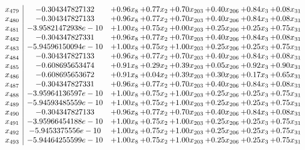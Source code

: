 \documentclass[8pt]{article}
\begin{document}
\[\begin{array}{c| c c@{\hskip 2pt} c@{\hskip 2pt} c@{\hskip 2pt} c@{\hskip 2pt} c@{\hskip 2pt} c@{\hskip 2pt} }
 x_{479}   &  -0.304347827132 & +  0.96 x_{8} & +  0.77 x_{2} & +  0.70 x_{203} & +  0.40 x_{206} & +  0.84 x_{3} & +  0.08 x_{31}\\
 x_{480}   &  -0.304347827133 & +  0.96 x_{8} & +  0.77 x_{2} & +  0.70 x_{203} & +  0.40 x_{206} & +  0.84 x_{3} & +  0.08 x_{31}\\
 x_{481}   &  -3.95821472938e-10 & +  1.00 x_{8} & +  0.75 x_{2} & +  0.00 x_{203} & +  0.25 x_{206} & +  0.25 x_{3} & +  0.75 x_{31}\\
 x_{482}   &  -0.304347827331 & +  0.96 x_{8} & +  0.77 x_{2} & +  0.70 x_{203} & +  0.40 x_{206} & +  0.84 x_{3} & +  0.08 x_{31}\\
 x_{483}   &  -5.94596150094e-10 & +  1.00 x_{8} & +  0.75 x_{2} & +  1.00 x_{203} & +  0.25 x_{206} & +  0.25 x_{3} & +  0.75 x_{31}\\
 x_{484}   &  -0.304347827133 & +  0.96 x_{8} & +  0.77 x_{2} & +  0.70 x_{203} & +  0.40 x_{206} & +  0.84 x_{3} & +  0.08 x_{31}\\
 x_{485}   &  -0.608695653474 & +  0.91 x_{8} & +  0.29 x_{2} & +  0.39 x_{203} & +  0.05 x_{206} & +  0.92 x_{3} & +  0.90 x_{31}\\
 x_{486}   &  -0.608695653672 & +  0.91 x_{8} & +  0.04 x_{2} & +  0.39 x_{203} & +  0.30 x_{206} & +  0.17 x_{3} & +  0.65 x_{31}\\
 x_{487}   &  -0.304347827331 & +  0.96 x_{8} & +  0.77 x_{2} & +  0.70 x_{203} & +  0.40 x_{206} & +  0.84 x_{3} & +  0.08 x_{31}\\
 x_{488}   &  -3.95964136597e-10 & +  1.00 x_{8} & +  0.75 x_{2} & +  1.00 x_{203} & +  0.25 x_{206} & +  0.25 x_{3} & +  0.75 x_{31}\\
 x_{489}   &  -5.94593485559e-10 & +  1.00 x_{8} & +  0.75 x_{2} & +  1.00 x_{203} & +  0.25 x_{206} & +  0.25 x_{3} & +  0.75 x_{31}\\
 x_{490}   &  -0.304347827133 & +  0.96 x_{8} & +  0.77 x_{2} & +  0.70 x_{203} & +  0.40 x_{206} & +  0.84 x_{3} & +  0.08 x_{31}\\
 x_{491}   &  -3.95966454188e-10 & +  1.00 x_{8} & +  0.75 x_{2} & +  1.00 x_{203} & +  0.25 x_{206} & +  0.25 x_{3} & +  0.75 x_{31}\\
 x_{492}   &  -5.9453375556e-10 & +  1.00 x_{8} & +  0.75 x_{2} & +  1.00 x_{203} & +  0.25 x_{206} & +  0.25 x_{3} & +  0.75 x_{31}\\
 x_{493}   &  -5.94464255599e-10 & +  1.00 x_{8} & +  0.75 x_{2} & +  1.00 x_{203} & +  0.25 x_{206} & +  0.25 x_{3} & +  0.75 x_{31}\\

\end{array}\]
\end{document}
